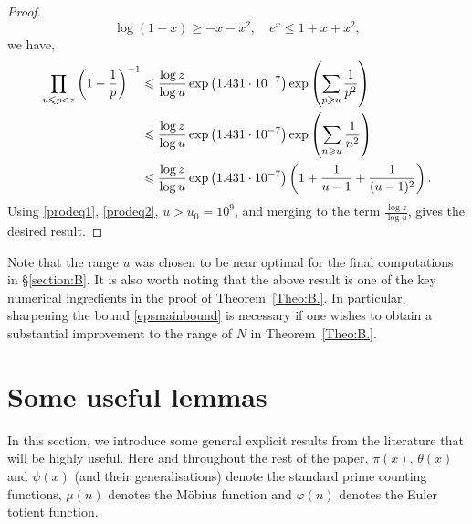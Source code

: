 \documentclass[12pt]{amsart}
\begin{document}
\begin{proof}
\begin{equation*}
        \log(1-x)\ge-x-x^2,\quad e^x\le 1+x+x^2,
    \end{equation*}
    we have,
    \begin{align}
        \prod_{u\le p<z}\left(1-\frac{1}{p}\right)^{-1}&\le\frac{\log z}{\log u}\exp\left(1.431\cdot 10^{-7}\right)\exp\left(\sum_{p\ge u}\frac{1}{p^2}\right)\notag\\
        &\le\frac{\log z}{\log u}\exp\left(1.431\cdot 10^{-7}\right)\exp\left(\sum_{n\ge u}\frac{1}{n^2}\right)\notag\\
        &\le\frac{\log z}{\log u}\exp\left(1.431\cdot 10^{-7}\right)\left(1+\frac{1}{u-1}+\frac{1}{(u-1)^2}\right).\label{prodeq2}
    \end{align}
    Using \eqref{prodeq1}, \eqref{prodeq2}, $u>u_0=10^{9}$, and merging to the term $\frac{\log z}{\log u}$, gives the desired result.
\end{proof}
Note that the range $u$ was chosen to be near optimal for the final computations in \S \ref{section:B}. It is also worth noting that the above result is one of the key numerical ingredients in the proof of Theorem~\ref{Theo:B.}. In particular, sharpening the bound \eqref{epsmainbound} is necessary if one wishes to obtain a substantial improvement to the range of $N$ in Theorem~\ref{Theo:B.}.

\section{Some useful lemmas}
\label{section:sur}
In this section, we introduce some general explicit results from the literature that will be highly useful. Here and throughout the rest of the paper, $\pi(x)$, $\theta(x)$ and $\psi(x)$ (and their generalisations) denote the standard prime counting functions, $\mu(n)$ denotes the Möbius function and $\varphi(n)$ denotes the Euler totient function. 
\end{document}
